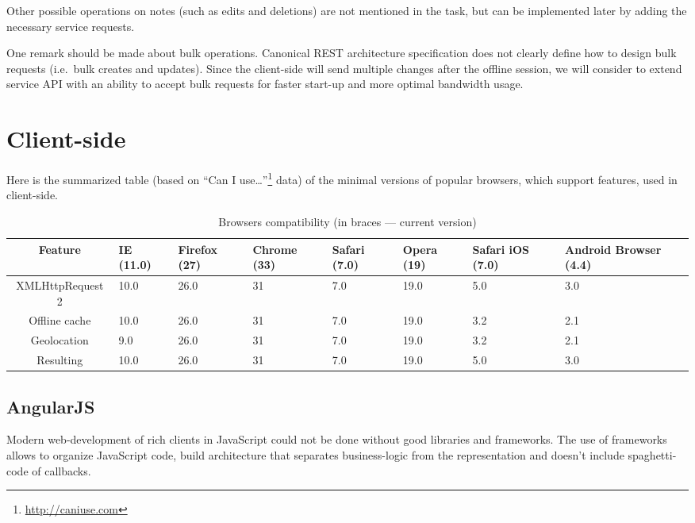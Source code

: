 \documentclass[12pt,a4paper]{article}
\begin{document}
Other possible operations on notes (such as edits and deletions) are
not mentioned in the task, but can be implemented later by adding the
necessary service requests.

One remark should be made about bulk operations. Canonical REST
architecture specification does not clearly define how to design bulk
requests (i.e.\ bulk creates and updates). Since the client-side will
send multiple changes after the offline session, we will consider to
extend service API with an ability to accept bulk requests for faster
start-up and more optimal bandwidth usage.

\section{Client-side}

Here is the summarized table (based on ``Can I
use\ldots''\footnote{\url{http://caniuse.com}} data) of the minimal
versions of popular browsers, which support features, used in
client-side.

\begin{table}[h!]
  \caption{Browsers compatibility (in braces --- current version)}
  \begin{tabularx}{\linewidth}{c X X X X X X X}
    \toprule
    Feature & IE (11.0) & Firefox (27) & Chrome (33) & Safari
    (7.0) & Opera (19) & Safari iOS (7.0) & Android Browser (4.4) \\
    \midrule
    XMLHttpRequest 2 & 10.0 & 26.0 & 31 & 7.0 & 19.0 & 5.0 & 3.0 \\
    Offline cache    & 10.0 & 26.0 & 31 & 7.0 & 19.0 & 3.2 & 2.1 \\
    Geolocation      &  9.0 & 26.0 & 31 & 7.0 & 19.0 & 3.2 & 2.1 \\
    \midrule
    Resulting        & 10.0 & 26.0 & 31 & 7.0 & 19.0 & 5.0 & 3.0 \\
    \bottomrule
  \end{tabularx}
\end{table}

\subsection{AngularJS}
Modern web-development of rich clients in JavaScript could not be done without
good libraries and frameworks. The use of frameworks allows to organize
JavaScript code, build architecture that separates business-logic from the
representation and doesn't include spaghetti-code of callbacks.
\end{document}
